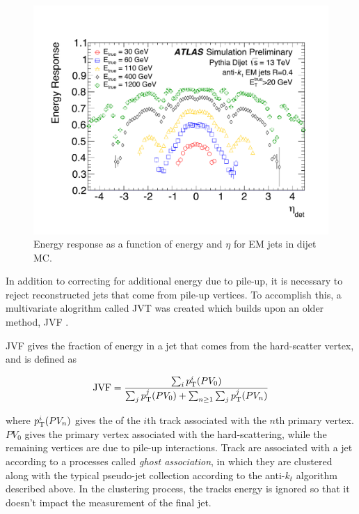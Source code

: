 \begin{centering}
\begin{figure}[!hbt]
\myfloatalign
\includegraphics[width=.9\linewidth]{figures/reco/fig_04a.pdf}
\caption{ Energy response as a function of energy and $\eta$ for \ac{EM} jets in dijet \ac{MC}. \cite{ATL-PHYS-PUB-2015-015} }
\label{fig:reco_JES}
\end{figure}
\end{centering}

In addition to correcting for additional energy due to pile-up, it is necessary to reject reconstructed jets that come from pile-up vertices. To accomplish this, a multivariate alogrithm called \ac{JVT} was created which builds upon an older method, \ac{JVF} \cite{ATLAS-CONF-2014-018}. 

\ac{JVF} gives the fraction of energy in a jet that comes from the hard-scatter vertex, and is defined as 

\begin{equation}
\mathrm{JVF} = \frac{\sum_i p_{\text{T}}^i(PV_0)}{\sum_j p_{\text{T}}^j(PV_0) + \sum_{n\geq1} \sum_j p_{\text{T}}^j(PV_n)} 
\end{equation}

where $p_{\text{T}}^i(PV_n)$ gives the \pt of the $i$th track associated with the $n$th primary vertex. $PV_0$ gives the primary vertex associated with the hard-scattering, while the remaining vertices are due to pile-up interactions. Track are associated with a jet according to a processes called \textit{ghost association}, in which they are clustered along with the typical pseudo-jet collection according to the anti-$k_t$ algorithm described above. In the clustering process, the tracks energy is ignored so that it doesn't impact the measurement of the final jet. 

